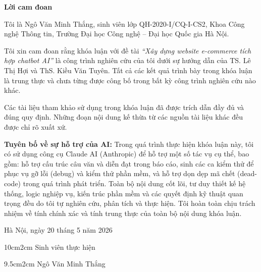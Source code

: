 \setcounter{page}{1}
\begin{center}
\textbf{\large{Lời cam đoan}}
\end{center}

Tôi là Ngô Văn Minh Thắng, sinh viên lớp QH-2020-I/CQ-I-CS2, Khoa Công nghệ Thông tin, Trường Đại học Công nghệ -- Đại học Quốc gia Hà Nội.

Tôi xin cam đoan rằng khóa luận với đề tài \textit{``Xây dựng website e-commerce tích hợp chatbot AI''} là công trình nghiên cứu của tôi dưới sự hướng dẫn của TS. Lê Thị Hợi và ThS. Kiều Văn Tuyên. Tất cả các kết quả trình bày trong khóa luận là trung thực và chưa từng được công bố trong bất kỳ công trình nghiên cứu nào khác.

Các tài liệu tham khảo sử dụng trong khóa luận đã được trích dẫn đầy đủ và đúng quy định. Những đoạn nội dung kế thừa từ các nguồn tài liệu khác đều được chỉ rõ xuất xứ.

\textbf{Tuyên bố về sự hỗ trợ của AI:} Trong quá trình thực hiện khóa luận này, tôi có sử dụng công cụ Claude AI (Anthropic) để hỗ trợ một số tác vụ cụ thể, bao gồm: hỗ trợ cấu trúc câu văn và diễn đạt trong báo cáo, sinh các ca kiểm thử để phục vụ gỡ lỗi (debug) và kiểm thử phần mềm, và hỗ trợ dọn dẹp mã chết (dead-code) trong quá trình phát triển. Toàn bộ nội dung cốt lõi, tư duy thiết kế hệ thống, logic nghiệp vụ, kiến trúc phần mềm và các quyết định kỹ thuật quan trọng đều do tôi tự nghiên cứu, phân tích và thực hiện. Tôi hoàn toàn chịu trách nhiệm về tính chính xác và tính trung thực của toàn bộ nội dung khóa luận.

\begin{flushright}
Hà Nội, ngày 20 tháng 5 năm 2026
\end{flushright}

\begin{changemargin}{10cm}{2cm}
Sinh viên thực hiện
\\[2cm]
\end{changemargin}

\begin{changemargin}{9.5cm}{2cm}
Ngô Văn Minh Thắng
\end{changemargin}

